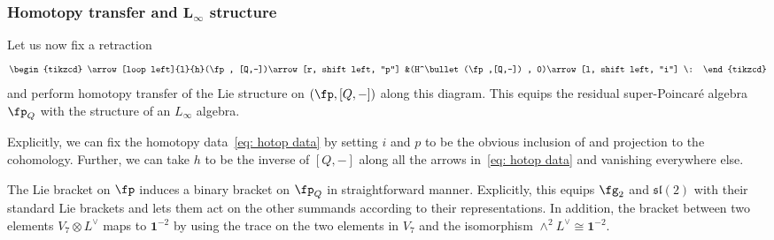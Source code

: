 \documentclass[10pt,a4paper]{amsart}
\numberwithin{equation}{section}
\theoremstyle{definition}
\def\lie#1{\ensuremath{\mathfrak{#1}}}
\def\bu{\bullet}
\begin{document}
\subsubsection[Homotopy transfer and L\_infty structure]{Homotopy transfer and $\boldsymbol{ L_\infty}$ structure}\label{p: maxtransfer}
Let us now fix a retraction
\begin{equation}
\begin{tikzcd}
\arrow[loop left]{l}{h}(\fp , [Q,-])\arrow[r, shift left, "p"] &(H^\bu(\fp,[Q,-]) , 0)\arrow[l, shift left, "i"] \:
\end{tikzcd}
\label{eq: hotop data}
\end{equation}
and perform homotopy transfer of the Lie structure on $(\fp , [Q,-])$ along this diagram. This equips the residual super-Poincar\'e algebra $\fp_Q$ with the structure of an $L_\infty$ algebra.

Explicitly, we can fix the homotopy data~\eqref{eq: hotop data} by setting $i$ and $p$ to be the obvious inclusion of and projection to the cohomology. Further, we can take $h$ to be the inverse of $[Q,-]$ along all the arrows in~\eqref{eq: hotop data} and vanishing everywhere else.

The Lie bracket on $\fp$ induces a binary bracket on $\fp_Q$ in straightforward manner. Explicitly, this equips $\fg_2$ and $\lie{sl}(2)$ with their standard Lie brackets and lets them act on the other summands according to their representations. In addition, the bracket between two elements $V_7 \otimes L^\vee$ maps to $\textbf{1}^{-2}$ by using the trace on the two elements in $V_7$ and the isomorphism $\wedge^2 L^\vee \cong \textbf{1}^{-2}$.
\end{document}
